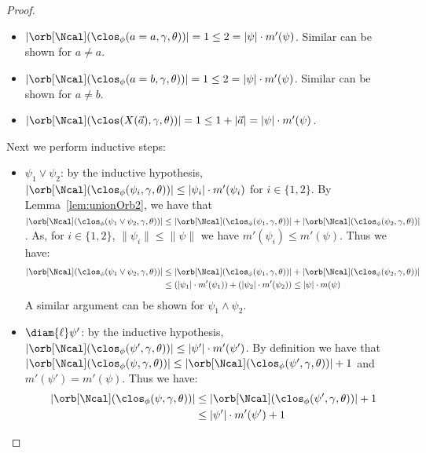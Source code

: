 \begin{proof}
\begin{enumerate}
		\begin{itemize}
			\item $|\orb[\Ncal](\clos_\phi(a = a, \gamma, \theta))|= 1 \le 2 = |\psi|\cdot m'(\psi)$.
			Similar can be shown for $a \neq a$.
			\item $|\orb[\Ncal](\clos_\phi(a = b, \gamma, \theta))| = 1 \le 2 = |\psi|\cdot m'(\psi)$.
			Similar can be shown for $a \neq b$.
			\item $|\orb[\Ncal](\clos(X(\vec a), \gamma, \theta))| = 1 \le 1 + |\vec a| = |\psi|\cdot m'(\psi)$.
		\end{itemize}
		Next we perform inductive steps:
		\begin{itemize}
			\item $\psi_1 \lor \psi_2$: by the inductive hypothesis, $|\orb[\Ncal](\clos_\phi(\psi_i,\gamma, \theta))| \le |\psi_i|\cdot m'(\psi_i)$ for $i \in \{1, 2\}$.
			By Lemma~\ref{lem:unionOrb2},
			we have that $|\orb[\Ncal](\clos_\phi(\psi_1 \lor \psi_2,\gamma, \theta))| \le |\orb[\Ncal](\clos_\phi(\psi_1, \gamma, \theta))| + |\orb[\Ncal](\clos_\phi(\psi_2,\gamma, \theta))|$.
			As, for $i \in \{1,2\}$, $\|\psi_i\| \le \|\psi\|$ we have $m'(\psi_i) \le m'(\psi)$. 
			Thus we have:
			\begin{align*}
				|\orb[\Ncal](\clos_\phi(\psi_1 \lor \psi_2,\gamma, \theta))| &\le |\orb[\Ncal](\clos_\phi(\psi_1, \gamma, \theta))| + |\orb[\Ncal](\clos_\phi(\psi_2,\gamma, \theta))| 
				\\&\le (|\psi_1|\cdot m'(\psi_1)) + (|\psi_2|\cdot m'(\psi_2)) \le |\psi|\cdot m(\psi)
			\end{align*}%
			A similar argument can be shown for $\psi_1 \land \psi_2$.
			\item $\diam{\ell}\psi'$: by the inductive hypothesis, $|\orb[\Ncal](\clos_\phi(\psi', \gamma, \theta))| \le |\psi'|\cdot m'(\psi')$.
			By definition
			we have that $|\orb[\Ncal](\clos_\phi(\psi, \gamma, \theta))| \le |\orb[\Ncal](\clos_\phi(\psi',\gamma,\theta))| + 1$ and $m'(\psi') = m'(\psi)$.
			Thus we have:
			\begin{align*}
				|\orb[\Ncal](\clos_\phi(\psi,\gamma,\theta))| &\le |\orb[\Ncal](\clos_\phi(\psi',\gamma,\theta))| + 1
				\\&\le |\psi'|\cdot m'(\psi') + 1 

\end{align*}
\end{itemize}
\end{enumerate}
\end{proof}
